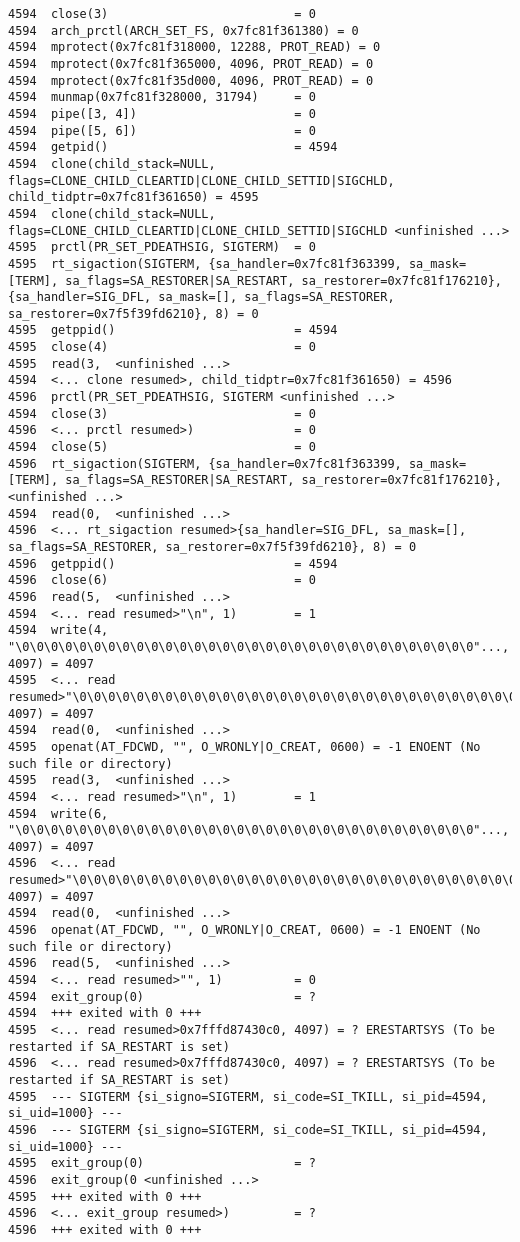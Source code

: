 \begin{verbatim}
4594  close(3)                          = 0
4594  arch_prctl(ARCH_SET_FS, 0x7fc81f361380) = 0
4594  mprotect(0x7fc81f318000, 12288, PROT_READ) = 0
4594  mprotect(0x7fc81f365000, 4096, PROT_READ) = 0
4594  mprotect(0x7fc81f35d000, 4096, PROT_READ) = 0
4594  munmap(0x7fc81f328000, 31794)     = 0
4594  pipe([3, 4])                      = 0
4594  pipe([5, 6])                      = 0
4594  getpid()                          = 4594
4594  clone(child_stack=NULL, flags=CLONE_CHILD_CLEARTID|CLONE_CHILD_SETTID|SIGCHLD, child_tidptr=0x7fc81f361650) = 4595
4594  clone(child_stack=NULL, flags=CLONE_CHILD_CLEARTID|CLONE_CHILD_SETTID|SIGCHLD <unfinished ...>
4595  prctl(PR_SET_PDEATHSIG, SIGTERM)  = 0
4595  rt_sigaction(SIGTERM, {sa_handler=0x7fc81f363399, sa_mask=[TERM], sa_flags=SA_RESTORER|SA_RESTART, sa_restorer=0x7fc81f176210}, {sa_handler=SIG_DFL, sa_mask=[], sa_flags=SA_RESTORER, sa_restorer=0x7f5f39fd6210}, 8) = 0
4595  getppid()                         = 4594
4595  close(4)                          = 0
4595  read(3,  <unfinished ...>
4594  <... clone resumed>, child_tidptr=0x7fc81f361650) = 4596
4596  prctl(PR_SET_PDEATHSIG, SIGTERM <unfinished ...>
4594  close(3)                          = 0
4596  <... prctl resumed>)              = 0
4594  close(5)                          = 0
4596  rt_sigaction(SIGTERM, {sa_handler=0x7fc81f363399, sa_mask=[TERM], sa_flags=SA_RESTORER|SA_RESTART, sa_restorer=0x7fc81f176210},  <unfinished ...>
4594  read(0,  <unfinished ...>
4596  <... rt_sigaction resumed>{sa_handler=SIG_DFL, sa_mask=[], sa_flags=SA_RESTORER, sa_restorer=0x7f5f39fd6210}, 8) = 0
4596  getppid()                         = 4594
4596  close(6)                          = 0
4596  read(5,  <unfinished ...>
4594  <... read resumed>"\n", 1)        = 1
4594  write(4, "\0\0\0\0\0\0\0\0\0\0\0\0\0\0\0\0\0\0\0\0\0\0\0\0\0\0\0\0\0\0\0\0"..., 4097) = 4097
4595  <... read resumed>"\0\0\0\0\0\0\0\0\0\0\0\0\0\0\0\0\0\0\0\0\0\0\0\0\0\0\0\0\0\0\0\0"..., 4097) = 4097
4594  read(0,  <unfinished ...>
4595  openat(AT_FDCWD, "", O_WRONLY|O_CREAT, 0600) = -1 ENOENT (No such file or directory)
4595  read(3,  <unfinished ...>
4594  <... read resumed>"\n", 1)        = 1
4594  write(6, "\0\0\0\0\0\0\0\0\0\0\0\0\0\0\0\0\0\0\0\0\0\0\0\0\0\0\0\0\0\0\0\0"..., 4097) = 4097
4596  <... read resumed>"\0\0\0\0\0\0\0\0\0\0\0\0\0\0\0\0\0\0\0\0\0\0\0\0\0\0\0\0\0\0\0\0"..., 4097) = 4097
4594  read(0,  <unfinished ...>
4596  openat(AT_FDCWD, "", O_WRONLY|O_CREAT, 0600) = -1 ENOENT (No such file or directory)
4596  read(5,  <unfinished ...>
4594  <... read resumed>"", 1)          = 0
4594  exit_group(0)                     = ?
4594  +++ exited with 0 +++
4595  <... read resumed>0x7fffd87430c0, 4097) = ? ERESTARTSYS (To be restarted if SA_RESTART is set)
4596  <... read resumed>0x7fffd87430c0, 4097) = ? ERESTARTSYS (To be restarted if SA_RESTART is set)
4595  --- SIGTERM {si_signo=SIGTERM, si_code=SI_TKILL, si_pid=4594, si_uid=1000} ---
4596  --- SIGTERM {si_signo=SIGTERM, si_code=SI_TKILL, si_pid=4594, si_uid=1000} ---
4595  exit_group(0)                     = ?
4596  exit_group(0 <unfinished ...>
4595  +++ exited with 0 +++
4596  <... exit_group resumed>)         = ?
4596  +++ exited with 0 +++

\end{verbatim}

\pagebreak